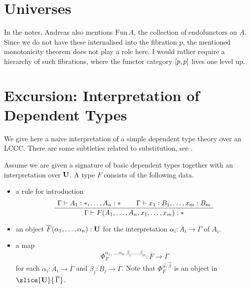\documentclass[runningheads,envcountsame,envcountsect,orivec]{llncs}
\begin{document}
\section{Universes}
In the notes, Andreas also mentions $\mathrm{Fun} \, A$, the collection of
endofunctors on $A$.
Since we do not have these internalised into the fibration $p$, the mentioned
monotonicity theorem does not play a role here.
I would rather require a hierarchy of such fibrations, where the functor
category $\left[ p, p \right]$ lives one level up.

\section{Excursion: Interpretation of Dependent Types}
We give here a naive interpretation of a simple dependent type theory over an
LCCC.
There are some subtleties related to substitution, see
\cite{Jacobs-CatLog, Hofmann-LCCC}.

Assume we are given a signature of basic dependent types together with an
interpretation over $\mathbf{U}$.
A type $F$ consists of the following data.
\begin{itemize}
\item a rule for introduction
  \begin{equation*}
    \AxiomC{$\Gamma \vdash A_1 : \ast, \dotsc, A_n : \ast$}
    \AxiomC{$\Gamma \vdash x_1 : B_1, \dotsc, x_m : B_m$}
    \BinaryInfC{$\Gamma \vdash F(A_1, \dotsc, A_n, x_1, \dotsc, x_m) : \ast$}
    \DisplayProof
  \end{equation*}
\item an object $\overline{F}(\alpha_1, \dotsc, \alpha_n) : \mathbf{U}$
  for the interpretation $\alpha_i : \overline{A}_i \to \overline{\Gamma}$ of
  $A_i$.
\item a map
  \begin{equation*}
    \Phi_F^{\alpha_1, \dotsc, \alpha_n, \beta_1, \dotsc, \beta_m} :
      \overline{F} \to \overline{\Gamma}
  \end{equation*}
  for each $\alpha_i : \overline{A}_i \to \overline{\Gamma}$
  and $\beta_j : \overline{B_j} \to \overline{\Gamma}$.
  Note that $\Phi_F^{\vec{\alpha},\vec{\beta}}$ is an object in
  $\slice{\Cat{U}}{\,\overline{\Gamma}}$.
\end{itemize}
\end{document}
